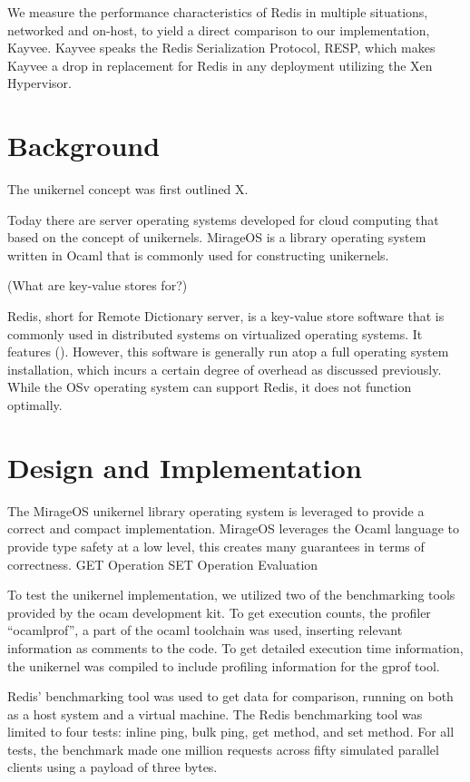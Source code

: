 \documentclass[english,10pt,twocolumn]{article}
\begin{document}
We measure the performance characteristics of Redis in multiple situations, networked and on-host, to yield a direct comparison to our implementation, Kayvee.
Kayvee speaks the Redis Serialization Protocol\cite{redis-protocol}, RESP, which makes Kayvee a drop in replacement for Redis in any deployment utilizing the Xen Hypervisor.


\section{Background}
The unikernel concept was first outlined X.

Today there are server operating systems developed for cloud computing that based on the concept of unikernels. MirageOS is a library operating system written in Ocaml that is commonly used for constructing unikernels.

(What are key-value stores for?) 

Redis, short for Remote Dictionary server, is a key-value store software that is commonly used in distributed systems on virtualized operating systems. It features (). However, this software is generally run atop a full operating system installation, which incurs a certain degree of overhead as discussed previously.  While the OSv operating system can support Redis, it does not function optimally.

\section{Design and Implementation}

The MirageOS unikernel library operating system is leveraged to provide a correct and compact implementation.
MirageOS leverages the Ocaml language to provide type safety at a low level, this creates many guarantees in terms of correctness.
GET Operation
SET Operation
Evaluation

To test the unikernel implementation, we utilized two of the benchmarking tools provided by the  ocam development kit. To get execution counts, the profiler “ocamlprof”, a part of the ocaml toolchain was used, inserting relevant information as comments to the code. To get detailed execution time information, the unikernel was compiled to include profiling information for the gprof tool.

Redis’ benchmarking tool was used to get data for comparison, running on both as a host system and a virtual machine. The Redis benchmarking tool was limited to four tests: inline ping, bulk ping, get method, and set method. For all tests, the benchmark made one million requests across fifty simulated parallel clients using a payload of three bytes.
\end{document}

